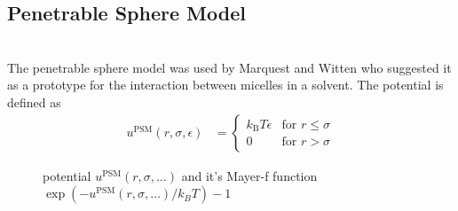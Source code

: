 \newpage
\subsection{Penetrable Sphere Model}
~\\

The penetrable sphere model was used by Marquest and
Witten \cite{Marquest1989} who suggested it as a prototype for the interaction between micelles in a solvent.
The potential is defined as \cite{Marquest1989,Viererblova2010}
\begin{align}
u^\text{PSM}(r,\sigma,\epsilon) &=
\begin{cases}
k_\text{B} T \epsilon   & \mbox{for } r \leq \sigma \\
0                       & \mbox{for } r >    \sigma
\end{cases}
\end{align}

\begin{figure}[htb]
\centering
  \quad
  \caption{potential $u^\text{PSM}(r,\sigma,\ldots)$ and it's Mayer-f function $\exp(-u^\text{PSM}(r,\sigma,\ldots)/k_BT)-1$}
\end{figure}

\newpage
